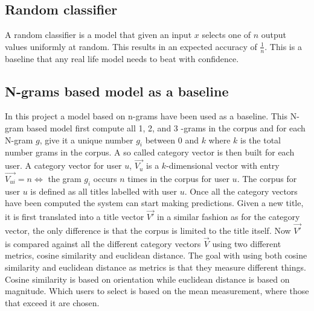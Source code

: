 \subsection{Random classifier}
A random classifier is a model that given an input $x$ selects one of $n$ output values uniformly at random. This results in an expected accuracy of $\frac{1}{n}$. This is a baseline that any real life model needs to beat with confidence.

\subsection{N-grams based model as a baseline}
In this project a model based on n-grams \parencite{cavnar1994n} have been used as a baseline. This N-gram based model first compute  all 1, 2, and 3 -grams in the corpus and for each N-gram $g$, give it a unique number $g_i$ between $0$ and $k$ where $k$ is the total number grams in the corpus. A so called category vector is then built for each user. A category vector for user $u$, $\vec{V_u}$ is a $k$-dimensional vector with entry $\vec{V_{ui}} = n \iff $ the gram $g_i$ occurs $n$ times in the corpus for user $u$. The corpus for user $u$ is defined as all titles labelled with user $u$. Once all the category vectors have been computed the system can start making predictions. Given a new title, it is first translated into a title vector $\vec{V'}$ in a similar fashion as for the category vector, the only difference is that the corpus is limited to the title itself. Now $\vec{V'}$ is compared against all the different category vectors $\vec{V}$ using two different metrics, cosine similarity \parencite{steinbach2000comparison} and euclidean distance. The goal with using both cosine similarity and euclidean distance as metrics is that they measure different things. Cosine similarity is based on orientation while euclidean distance is based on magnitude. Which users to select is based on the mean measurement, where those that exceed it are chosen. 

